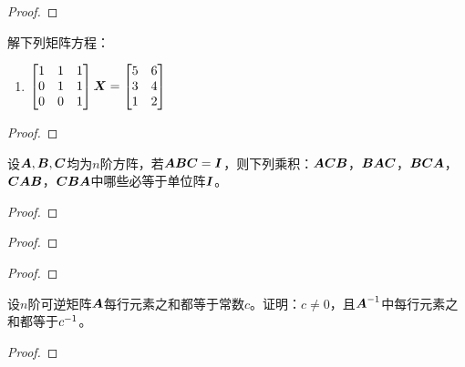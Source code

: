 \begin{problem}

\end{problem}
\begin{proof}

\end{proof}

\begin{problem}
解下列矩阵方程：
\begin{enumerate}
    \item \(\begin{bmatrix}1&1&1\\0&1&1\\0&0&1\end{bmatrix}\boldsymbol{X}=\begin{bmatrix}5&6\\3&4\\1&2\end{bmatrix}\)
\end{enumerate}
\end{problem}
\begin{proof}

\end{proof}

\begin{problem}
设\(\boldsymbol{A},\boldsymbol{B},\boldsymbol{C}\)均为\(n\)阶方阵，若\(\boldsymbol{A}\boldsymbol{B}\boldsymbol{C}=\boldsymbol{I}\)，则下列乘积：\(\boldsymbol{A}\boldsymbol{C}\boldsymbol{B}\)，\(\boldsymbol{B}\boldsymbol{A}\boldsymbol{C}\)，\(\boldsymbol{B}\boldsymbol{C}\boldsymbol{A}\)，\(\boldsymbol{C}\boldsymbol{A}\boldsymbol{B}\)，\(\boldsymbol{C}\boldsymbol{B}\boldsymbol{A}\)中哪些必等于单位阵\(\boldsymbol{I}\)。
\end{problem}
\begin{proof}

\end{proof}

\begin{problem}

\end{problem}
\begin{proof}

\end{proof}

\begin{problem}

\end{problem}
\begin{proof}

\end{proof}

\begin{problem}
设\(n\)阶可逆矩阵\(\boldsymbol{A}\)每行元素之和都等于常数\(c\)。证明：\(c\neq0\)，且\({\boldsymbol{A}}^{-1}\)中每行元素之和都等于\({c}^{-1}\)。
\end{problem}
\begin{proof}

\end{proof}

